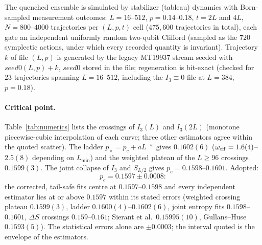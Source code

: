 \documentclass[11pt]{article}
\begin{document}
The quenched ensemble is simulated by stabilizer (tableau) dynamics with
Born-sampled measurement outcomes: $L=16$--$512$, $p=0.14$--$0.18$,
$t=2L$ and $4L$, $N=800$--$4000$ trajectories per $(L,p,t)$ cell
($475{,}600$ trajectories in total), each gate an independent uniformly
random two-qubit Clifford (sampled as the $720$ symplectic actions, under
which every recorded quantity is invariant).  Trajectory $k$ of file
$(L,p)$ is generated by the legacy MT19937 stream seeded with
$\mathit{seed0}(L,p)+k$, $\mathit{seed0}$ stored in the file; regeneration
is bit-exact (checked for $23$ trajectories spanning $L=16$--$512$,
including the $I_3\equiv0$ file at $L=384$, $p=0.18$).

\paragraph{Critical point.}
Table~\ref{tab:numerics} lists the crossings of $I_3(L)$ and $I_3(2L)$
(monotone piecewise-cubic interpolation of each curve; three other
estimators agree within the quoted scatter).  The ladder
$p_\times=p_c+aL^{-\omega}$ gives $0.1602(6)$
($\omega_{\rm eff}=1.6(4)$--$2.5(8)$ depending on $L_{\min}$) and the
weighted plateau of the $L\ge96$ crossings $0.1599(3)$.  The joint collapse
of $I_3$ and $S_{L/2}$ gives $p_c=0.1598$--$0.1601$.  Adopted:
\begin{equation}
  p_c=0.1597\pm0.0008:
  \label{eq:adoptedpc}
\end{equation}
the corrected, tail-safe fits centre at $0.1597$--$0.1598$ and every
independent estimator lies at or above $0.1597$ within its stated errors
(weighted crossing plateau $0.1599(3)$, ladder $0.1600(4)$--$0.1602(6)$,
joint entropy fits $0.1598$--$0.1601$, $\Delta S$ crossings
$0.159$--$0.161$; Sierant et al.\ $0.15995(10)$, Gullans--Huse
$0.1593(5)$).  The statistical errors alone are $\pm0.0003$; the interval
quoted is the envelope of the estimators.
\end{document}
